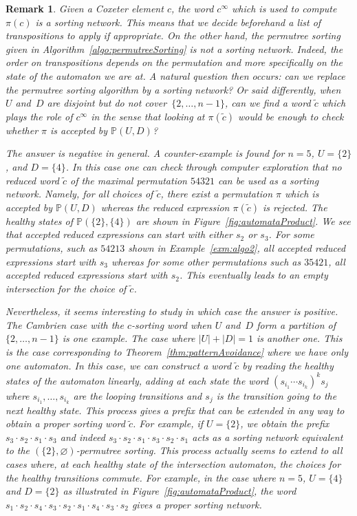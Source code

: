 \documentclass{amsart}
\newtheorem{remark}[theorem]{Remark}
\newcommand{\defn}[1]{\textsl{\color{darkblue} #1}} %
\newcommand{\automatonP}{\mathbb{P}} %
\begin{document}
\begin{remark}
Given a Coxeter element $c$, the word $c^\infty$ which is used to compute $\pi(c)$ is a \defn{sorting network}. This means that we decide \emph{beforehand} a list of transpositions to apply if appropriate. On the other hand, the permutree sorting given in Algorithm~\ref{algo:permutreeSorting} is \emph{not} a sorting network. Indeed, the order on transpositions depends on the permutation and more specifically on the state of the automaton we are at. A natural question then occurs: can we replace the permutree sorting algorithm by a sorting network? Or said differently, when~$U$ and~$D$ are disjoint but do not cover~$\{2, \dots, n-1\}$, can we find a word $\tilde{c}$ which plays the role of $c^\infty$ in the sense that looking at $\pi(\tilde{c})$ would be enough to check whether $\pi$ is accepted by $\automatonP(U,D)$?

The answer is negative in general. A counter-example is found for $n = 5$, $U = \{ 2\}$, and $D=\{ 4 \}$. In this case one can check through computer exploration that no reduced word $\tilde{c}$ of the maximal permutation $54321$ can be used as a sorting network. Namely, for all choices of $\tilde{c}$, there exist a permutation $\pi$ which is accepted by $\automatonP(U,D)$ whereas the reduced expression $\pi(\tilde{c})$ is rejected. The healthy states of $\automatonP(\{ 2\},\{ 4 \})$ are shown in Figure~\ref{fig:automataProduct}. We see that accepted reduced expressions can start with either $s_2$ or $s_3$. For some permutations, such as $54213$ shown in Example~\ref{exm:algo2}, all accepted reduced expressions start with $s_3$ whereas for some other permutations such as $35421$, all accepted reduced expressions start with $s_2$. This eventually leads to an empty intersection for the choice of $\tilde{c}$.

Nevertheless, it seems interesting to study in which case the answer is positive. The Cambrien case with the $c$-sorting word when $U$ and~$D$ form a partition of~$\{2, \dots, n-1\}$ is one example. The case where $|U| + |D| = 1$ is another one. This is the case corresponding to Theorem~\ref{thm:patternAvoidance} where we have only one automaton. In this case, we can construct a word $\tilde{c}$ by reading the healthy states of the automaton linearly, adding at each state the word $(s_{i_1} \cdots s_{i_k})^k s_j$ where $s_{i_1}, \dots, s_{i_k}$ are the looping transitions and $s_j$ is the transition going to the next healthy state. This process gives a prefix that can be extended in any way to obtain a proper sorting word $\tilde{c}$. For example, if $U = \{2\}$, we obtain the prefix $s_3 \cdot s_2 \cdot s_1 \cdot s_3$ and indeed $s_3 \cdot s_2 \cdot s_1 \cdot s_3 \cdot s_2 \cdot s_1$ acts as a sorting network equivalent to the $(\{2\},\varnothing)$-permutree sorting. This process actually seems to extend to all cases where, at each healthy state of the intersection automaton, the choices for the healthy transitions commute. For example, in the case where $n=5$, $U = \{ 4 \}$ and $D = \{ 2 \}$ as illustrated in Figure~\ref{fig:automataProduct}, the word $s_1 \cdot s_2 \cdot s_4 \cdot s_3 \cdot s_2 \cdot s_1 \cdot s_4 \cdot s_3 \cdot s_2$ gives a proper sorting network. 
\end{remark}




\end{document}
